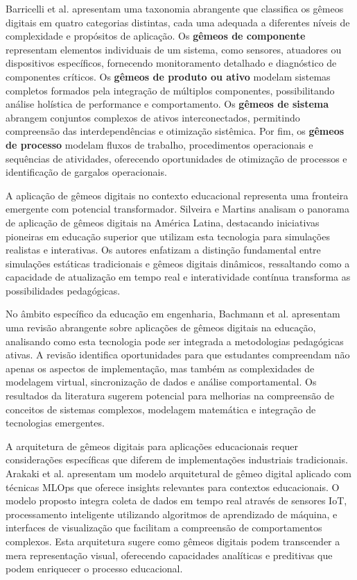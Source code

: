 \documentclass[12pt, a4paper, oneside, brazilian]{abntex2}
\begin{document}
Barricelli et al. \cite{barricelli2019} apresentam uma taxonomia abrangente que classifica os gêmeos digitais em quatro categorias distintas, cada uma adequada a diferentes níveis de complexidade e propósitos de aplicação. Os \textbf{gêmeos de componente} representam elementos individuais de um sistema, como sensores, atuadores ou dispositivos específicos, fornecendo monitoramento detalhado e diagnóstico de componentes críticos. Os \textbf{gêmeos de produto ou ativo} modelam sistemas completos formados pela integração de múltiplos componentes, possibilitando análise holística de performance e comportamento. Os \textbf{gêmeos de sistema} abrangem conjuntos complexos de ativos interconectados, permitindo compreensão das interdependências e otimização sistêmica. Por fim, os \textbf{gêmeos de processo} modelam fluxos de trabalho, procedimentos operacionais e sequências de atividades, oferecendo oportunidades de otimização de processos e identificação de gargalos operacionais.

A aplicação de gêmeos digitais no contexto educacional representa uma fronteira emergente com potencial transformador. Silveira e Martins \cite{silveira2024panorama} analisam o panorama de aplicação de gêmeos digitais na América Latina, destacando iniciativas pioneiras em educação superior que utilizam esta tecnologia para simulações realistas e interativas. Os autores enfatizam a distinção fundamental entre simulações estáticas tradicionais e gêmeos digitais dinâmicos, ressaltando como a capacidade de atualização em tempo real e interatividade contínua transforma as possibilidades pedagógicas.

No âmbito específico da educação em engenharia, Bachmann et al. \cite{bachmann2023} apresentam uma revisão abrangente sobre aplicações de gêmeos digitais na educação, analisando como esta tecnologia pode ser integrada a metodologias pedagógicas ativas. A revisão identifica oportunidades para que estudantes compreendam não apenas os aspectos de implementação, mas também as complexidades de modelagem virtual, sincronização de dados e análise comportamental. Os resultados da literatura sugerem potencial para melhorias na compreensão de conceitos de sistemas complexos, modelagem matemática e integração de tecnologias emergentes.

A arquitetura de gêmeos digitais para aplicações educacionais requer considerações específicas que diferem de implementações industriais tradicionais. Arakaki et al. \cite{arakaki2022} apresentam um modelo arquitetural de gêmeo digital aplicado com técnicas MLOps que oferece insights relevantes para contextos educacionais. O modelo proposto integra coleta de dados em tempo real através de sensores IoT, processamento inteligente utilizando algoritmos de aprendizado de máquina, e interfaces de visualização que facilitam a compreensão de comportamentos complexos. Esta arquitetura sugere como gêmeos digitais podem transcender a mera representação visual, oferecendo capacidades analíticas e preditivas que podem enriquecer o processo educacional.
\end{document}
